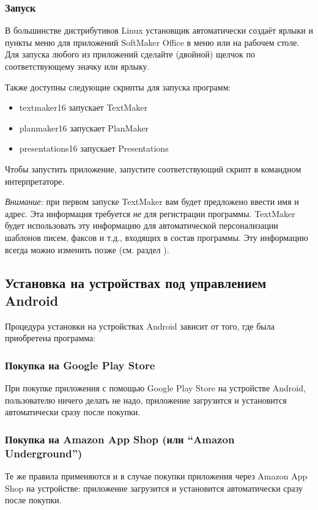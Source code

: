 ﻿\documentclass[a4paper,10pt]{article}
\begin{document}
\subsubsection{Запуск}
В большинстве дистрибутивов Linux установщик автоматически создаёт ярлыки и пункты меню для приложений SoftMaker Office в меню или на рабочем столе. Для запуска любого из приложений сделайте (двойной) щелчок по соответствующему значку или ярлыку.

Также доступны следующие скрипты для запуска программ:
\begin{itemize}
 \item textmaker16 запускает TextMaker
 \item planmaker16 запускает PlanMaker
 \item presentations16 запускает Presentations
\end{itemize}

Чтобы запустить приложение, запустите соответствующий скрипт в командном интерпретаторе.

{\footnotesize \textit{Внимание:} при первом запуске TextMaker вам будет предложено ввести имя и адрес. Эта информация требуется \textit{не} для регистрации программы. TextMaker будет использовать эту информацию для автоматической персонализации шаблонов писем, факсов и т.д., входящих в состав программы. Эту информацию всегда можно изменить позже (см. раздел ).}

\subsection{Установка на устройствах под управлением Android}
Процедура установки на устройствах Android зависит от того, где была приобретена программа:
\subsubsection{Покупка на Google Play Store}
При покупке приложения с помощью Google Play Store на устройстве Android, пользователю ничего делать не надо, приложение загрузится и установится автоматически сразу после покупки.
\subsubsection{Покупка на Amazon App Shop (или “Amazon Underground”)}
Те же правила применяются и в случае покупки приложения через Amazon App Shop на устройстве: приложение загрузится и установится автоматически сразу после покупки.
\end{document}
